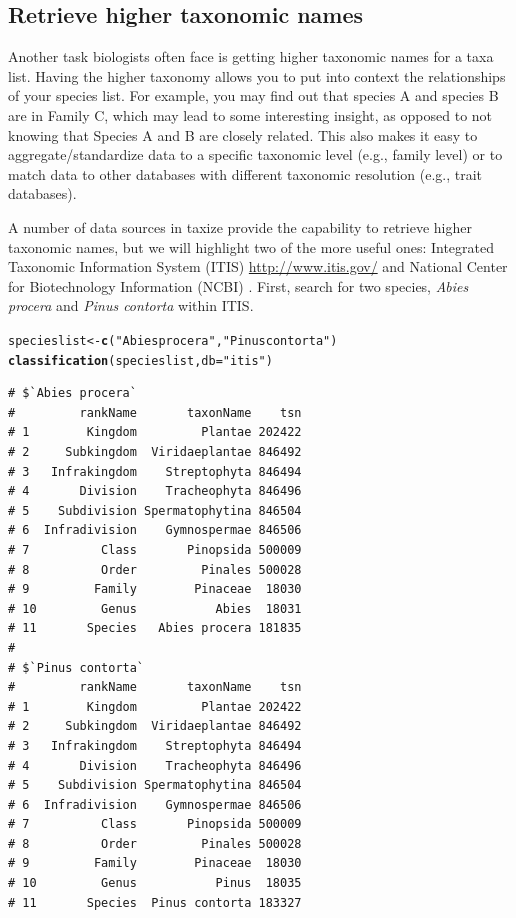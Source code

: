 \documentclass[10pt,a4paper,twocolumn]{article}\usepackage[]{graphicx}\usepackage[]{color}
\makeatletter
\newcommand{\hlstr}[1]{\textcolor[rgb]{0.192,0.494,0.8}{#1}}%
\newcommand{\hlstd}[1]{\textcolor[rgb]{0.345,0.345,0.345}{#1}}%
\newcommand{\hlkwb}[1]{\textcolor[rgb]{0.69,0.353,0.396}{#1}}%
\newcommand{\hlkwc}[1]{\textcolor[rgb]{0.333,0.667,0.333}{#1}}%
\newcommand{\hlkwd}[1]{\textcolor[rgb]{0.737,0.353,0.396}{\textbf{#1}}}%
\newenvironment{kframe}{%
 \def\at@end@of@kframe{}%
 \ifinner\ifhmode%
  \def\at@end@of@kframe{\end{minipage}}%
  \begin{minipage}{\columnwidth}%
 \fi\fi%
 \def\FrameCommand##1{\hskip\@totalleftmargin \hskip-\fboxsep
 \colorbox{shadecolor}{##1}\hskip-\fboxsep
     \hskip-\linewidth \hskip-\@totalleftmargin \hskip\columnwidth}%
 \MakeFramed {\advance\hsize-\width
   \@totalleftmargin\z@ \linewidth\hsize
   \@setminipage}}%
 {\par\unskip\endMakeFramed%
 \at@end@of@kframe}
\newenvironment{knitrout}{}{} %
\makeatother
\begin{document}
\subsection*{Retrieve higher taxonomic names}
Another task biologists often face is getting higher taxonomic names for a taxa list. Having the higher taxonomy allows you to put into context the relationships of your species list. For example, you may find out that species A and species B are in Family C, which may lead to some interesting insight, as opposed to not knowing that Species A and B are closely related. This also makes it easy to aggregate/standardize data to a specific taxonomic level (e.g., family level) or to match data to other databases with different taxonomic resolution (e.g., trait databases).

A number of data sources in taxize provide the capability to retrieve higher taxonomic names, but we will highlight two of the more useful ones: Integrated Taxonomic Information System (ITIS) \url{http://www.itis.gov/} and National Center for Biotechnology Information (NCBI) \cite{federhen2012}. First, search for two species, \emph{Abies procera} and \emph{Pinus contorta} within ITIS.

\begin{knitrout}\scriptsize
{}\color{fgcolor}\begin{kframe}
\begin{alltt}
\hlstd{specieslist} \hlkwb{<-} \hlkwd{c}\hlstd{(}\hlstr{"Abies procera"}\hlstd{,} \hlstr{"Pinus contorta"}\hlstd{)}
\hlkwd{classification}\hlstd{(specieslist,} \hlkwc{db} \hlstd{=} \hlstr{"itis"}\hlstd{)}
\end{alltt}
\begin{verbatim}
# $`Abies procera`
#         rankName       taxonName    tsn
# 1        Kingdom         Plantae 202422
# 2     Subkingdom  Viridaeplantae 846492
# 3   Infrakingdom    Streptophyta 846494
# 4       Division    Tracheophyta 846496
# 5    Subdivision Spermatophytina 846504
# 6  Infradivision    Gymnospermae 846506
# 7          Class       Pinopsida 500009
# 8          Order         Pinales 500028
# 9         Family        Pinaceae  18030
# 10         Genus           Abies  18031
# 11       Species   Abies procera 181835
# 
# $`Pinus contorta`
#         rankName       taxonName    tsn
# 1        Kingdom         Plantae 202422
# 2     Subkingdom  Viridaeplantae 846492
# 3   Infrakingdom    Streptophyta 846494
# 4       Division    Tracheophyta 846496
# 5    Subdivision Spermatophytina 846504
# 6  Infradivision    Gymnospermae 846506
# 7          Class       Pinopsida 500009
# 8          Order         Pinales 500028
# 9         Family        Pinaceae  18030
# 10         Genus           Pinus  18035
# 11       Species  Pinus contorta 183327
\end{verbatim}
\end{kframe}
\end{knitrout}
\end{document}
